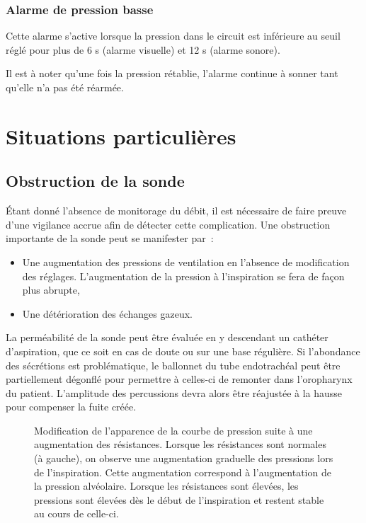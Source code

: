 \subsubsection*{Alarme de pression basse}

Cette alarme s'active lorsque la pression dans le circuit est inférieure
au seuil réglé pour plus de 6 s (alarme visuelle) et 12 s (alarme
sonore).

Il est à noter qu'une fois la pression rétablie, l'alarme continue à
sonner tant qu'elle n'a pas été réarmée.

\section{Situations particulières}

\subsection{Obstruction de la sonde}

Étant donné l'absence de monitorage du débit, il est nécessaire de faire preuve
d'une vigilance accrue afin de détecter cette complication. Une obstruction
importante de la sonde peut se manifester par :
		
\begin{itemize}
	\item Une augmentation des pressions de ventilation en l'absence de
	modification des réglages. L'augmentation de la pression à l'inspiration se
	fera de façon plus abrupte, 
	\item Une détérioration des échanges gazeux.
\end{itemize}

La perméabilité de la sonde peut être évaluée en y descendant un cathéter
d'aspiration, que ce soit en cas de doute ou sur une base régulière.  Si
l'abondance des sécrétions est problématique, le ballonnet du tube endotrachéal
peut être partiellement dégonflé pour permettre à celles-ci de remonter dans
l'oropharynx du patient. L'amplitude des percussions devra alors être réajustée
à la hausse pour compenser la fuite créée.

\begin{figure}

\caption{Modification de l'apparence de la courbe de pression suite à une
augmentation des résistances. Lorsque les résistances sont normales (à gauche),
on observe une augmentation graduelle des pressions lors de l'inspiration.
Cette augmentation correspond à l'augmentation de la pression alvéolaire.
Lorsque les résistances sont élevées, les pressions sont élevées dès le début
de l'inspiration et restent stable au cours de celle-ci.}
\end{figure}

